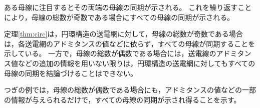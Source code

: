 \documentclass[tombow,dvipdfmx]{corona-a5-1.1}
\begin{document}
\begin{証明}
ある母線に注目するとその両端の母線の同期が示される。
これを繰り返すことにより，母線の総数が奇数である場合にすべての母線の同期が示される。
\end{証明}


定理\ref{thm:circ}は，円環構造の送電網に対して，母線の総数が奇数である場合は，各送電網のアドミタンスの値などに依らず，すべての母線が同期することを示している。
一方で，母線の総数が偶数である場合には，送電線のアドミタンス値などの追加の情報を用いない限りは，円環構造の送電網に対してもすべての母線の同期を結論づけることはできない。

つぎの例では，母線の総数が偶数である場合にも，アドミタンスの値などの一部の情報が与えられるだけで，すべての母線の同期が示され得ることを示す。


%
\end{document}
